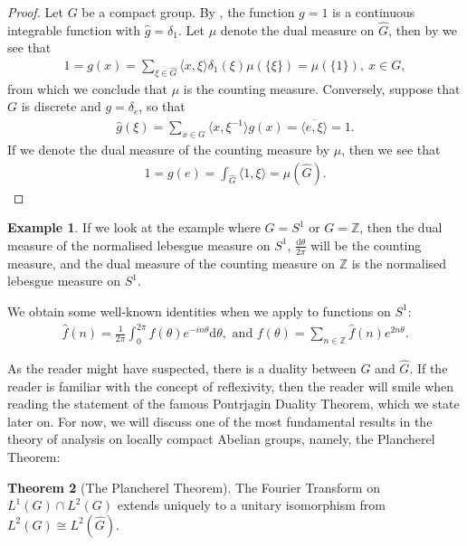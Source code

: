 \documentclass[10pt,twoside,openany,final]{memoir}
\theoremstyle{definition}
\newtheorem{theorem}{Theorem}[chapter]
\theoremstyle{Break}
\newtheorem{example}[theorem]{Example}
\newcommand{\Z}{\mathbb{Z}}
\newcommand{\G}{\widehat{G}}
\renewcommand{\d}{\mathrm{d}}
\begin{document}
\begin{proof}
	Let $G$ be a compact group. By , the function $g=1$ is a continuous integrable function with $\widehat{g}=\delta_{1}$. Let $\mu$ denote the dual measure on $\G$, then by  we see that
	\begin{align*}
		1=g(x)=\sum_{\xi \in \G} \langle x, \xi \rangle \delta_1(\xi) \mu(\{ \xi \})=\mu(\{1\}), \ x \in G,	
	\end{align*}
	from which we conclude that $\mu$ is the counting measure. Conversely, suppose that $G$ is discrete and $g=\delta_{e}$, so that
	\begin{align*}
		\widehat{g}(\xi)=\sum_{x \in G}\langle x , \xi^{-1}\rangle g(x)=\overline{\langle e,\xi\rangle }= 1.
	\end{align*}
	If we denote the dual measure of the counting measure by $\mu$, then we see that
	\begin{align*}
		1=g(e) = \int_{\G} \langle 1 , \xi \rangle = \mu(\G).
	\end{align*}
\end{proof}
\begin{example}
	If we look at the example where $G=S^1$ or $G=\Z$, then the dual measure of the normalised lebesgue measure on $S^1$, $\frac{\d \theta}{2 \pi}$ will be the counting measure, and the dual measure of the counting measure on $\Z$ is the normalised lebesgue measure on $S^1$.
	
	We obtain some well-known identities when we apply  to functions on $S^1$:
	\begin{align*}
		\widehat{f}(n)= \frac{1}{2 \pi}\int_{0}^{2 \pi} f(\theta) e^{-i n \theta}  \d \theta, \text{ and } f(\theta)=\sum_{n \in \Z} \widehat{f}(n) e^{2n\theta}.
	\end{align*}
\end{example}
As the reader might have suspected, there is a duality between $G$ and $\G$. If the reader is familiar with the concept of reflexivity, then the reader will smile when reading the statement of the famous Pontrjagin Duality Theorem, which we state later on. For now, we will discuss one of the most fundamental results in the theory of analysis on locally compact Abelian groups, namely, the Plancherel Theorem:
\begin{theorem}[The Plancherel Theorem]
	The Fourier Transform on $L^1(G) \cap L^2(G)$ extends uniquely to a unitary isomorphism from $L^2(G) \cong L^2(\G)$.
	\label{4.25}
\end{theorem}
\end{document}
